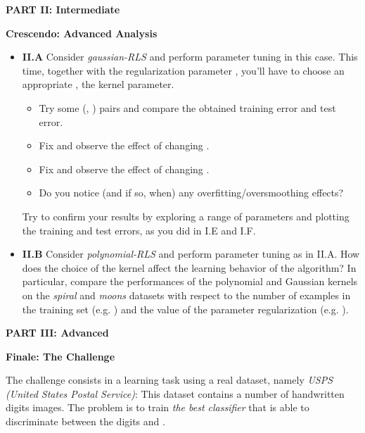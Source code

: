 \documentclass[DIN, pagenumber=false, fontsize=11pt, parskip=half]{scrartcl}
\newcommand{\mysection}[1]{\noindent\large\textbf{#1}}
\begin{document}
\begin{center}
\large\textbf{PART II: Intermediate}
\end{center}

\mysection{Crescendo: Advanced Analysis}

\begin{itemize}
	\item \textbf{II.A} Consider \emph{gaussian-RLS} and perform parameter tuning in this case. This time, together with the regularization parameter , you'll have to choose an appropriate , the kernel parameter.
\begin{itemize}
  \item Try some (, ) pairs and compare the obtained training error  and test error.
  \item Fix  and observe the effect of changing .
  \item Fix  and observe the effect of changing .
  \item Do you notice (and if so, when) any overfitting/oversmoothing effects?
\end{itemize}
 Try to confirm your results by exploring a range of parameters and plotting the training and test errors, as you did in I.E and I.F.

	\item \textbf{II.B} Consider \emph{polynomial-RLS} and perform parameter tuning as in II.A. How does the choice of the kernel affect the learning behavior of the algorithm? In particular, compare the performances of the polynomial and Gaussian kernels on the \emph{spiral} and \emph{moons} datasets with respect to the number of examples in the training set (e.g. \mcode{[10, 20, 50, 100, 1000]}) and the value of the parameter regularization (e.g. \mcode{[0.5, 0.1, 0.01, 0.001, 0.0001]}).
\end{itemize}



\begin{center}
\large\textbf{PART III: Advanced}
\end{center}

\mysection{Finale: The Challenge}

The challenge consists in a learning task using a real dataset, namely \emph{USPS (United States Postal Service)}: This dataset contains a number of handwritten digits images. The problem is to train \emph{the best classifier} that is able to discriminate between the digits  and .
\end{document}
